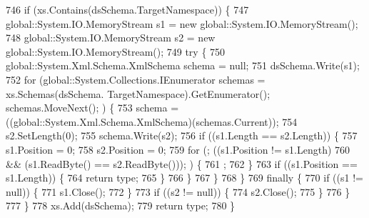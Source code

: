 \begin{DoxyCode}
746                 \textcolor{keywordflow}{if} (xs.Contains(dsSchema.TargetNamespace)) \{
747                     global::System.IO.MemoryStream s1 = \textcolor{keyword}{new} global::System.IO.MemoryStream();
748                     global::System.IO.MemoryStream s2 = \textcolor{keyword}{new} global::System.IO.MemoryStream();
749                     \textcolor{keywordflow}{try} \{
750                         global::System.Xml.Schema.XmlSchema schema = null;
751                         dsSchema.Write(s1);
752                         \textcolor{keywordflow}{for} (global::System.Collections.IEnumerator schemas = xs.Schemas(dsSchema.
      TargetNamespace).GetEnumerator(); schemas.MoveNext(); ) \{
753                             schema = ((global::System.Xml.Schema.XmlSchema)(schemas.Current));
754                             s2.SetLength(0);
755                             schema.Write(s2);
756                             \textcolor{keywordflow}{if} ((s1.Length == s2.Length)) \{
757                                 s1.Position = 0;
758                                 s2.Position = 0;
759                                 \textcolor{keywordflow}{for} (; ((s1.Position != s1.Length) 
760                                             && (s1.ReadByte() == s2.ReadByte())); ) \{
761                                     ;
762                                 \}
763                                 \textcolor{keywordflow}{if} ((s1.Position == s1.Length)) \{
764                                     \textcolor{keywordflow}{return} type;
765                                 \}
766                             \}
767                         \}
768                     \}
769                     \textcolor{keywordflow}{finally} \{
770                         \textcolor{keywordflow}{if} ((s1 != null)) \{
771                             s1.Close();
772                         \}
773                         \textcolor{keywordflow}{if} ((s2 != null)) \{
774                             s2.Close();
775                         \}
776                     \}
777                 \}
778                 xs.Add(dsSchema);
779                 \textcolor{keywordflow}{return} type;
780             \}
\end{DoxyCode}

